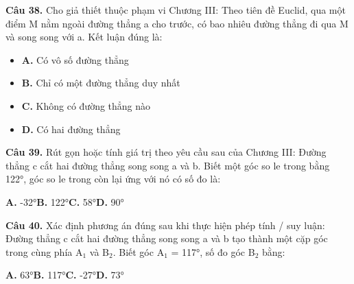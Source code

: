 \documentclass[11pt,a4paper]{article}
\begin{document}
\textbf{\color{primary} Câu 38.} Cho giả thiết thuộc phạm vi Chương III: Theo tiên đề Euclid, qua một điểm M nằm ngoài đường thẳng a cho trước, có bao nhiêu đường thẳng đi qua M và song song với a. Kết luận đúng là:\par
\begin{itemize}\setlength{\itemsep}{1pt}\setlength{\parskip}{0pt}
  \item[] \textbf{A.} Có vô số đường thẳng
  \item[] \textbf{B.} Chỉ có một đường thẳng duy nhất
  \item[] \textbf{C.} Không có đường thẳng nào
  \item[] \textbf{D.} Có hai đường thẳng
\end{itemize}\vspace{2pt}
\textbf{\color{primary} Câu 39.} Rút gọn hoặc tính giá trị theo yêu cầu sau của Chương III: Đường thẳng c cắt hai đường thẳng song song a và b. Biết một góc so le trong bằng 122°, góc so le trong còn lại ứng với nó có số đo là:\par
\hspace*{1.5em}\textbf{A.} -32°\quad\quad \textbf{B.} 122°\quad\quad \textbf{C.} 58°\quad\quad \textbf{D.} 90°\par\vspace{2pt}
\textbf{\color{primary} Câu 40.} Xác định phương án đúng sau khi thực hiện phép tính / suy luận: Đường thẳng c cắt hai đường thẳng song song a và b tạo thành một cặp góc trong cùng phía A$_1$ và B$_2$. Biết góc A$_1$ = 117°, số đo góc B$_2$ bằng:\par
\hspace*{1.5em}\textbf{A.} 63°\quad\quad \textbf{B.} 117°\quad\quad \textbf{C.} -27°\quad\quad \textbf{D.} 73°\par\vspace{2pt}
\end{document}
